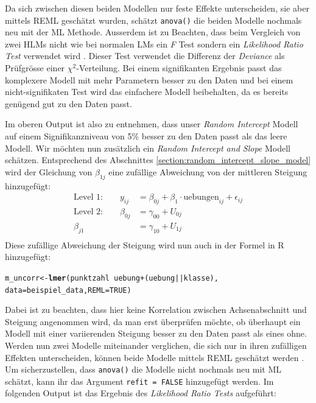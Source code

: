 \documentclass[12pt, a4paper]{article}\usepackage[]{graphicx}\usepackage[]{color}
\makeatletter
\newcommand{\hlnum}[1]{\textcolor[rgb]{0.686,0.059,0.569}{#1}}%
\newcommand{\hlopt}[1]{\textcolor[rgb]{0,0,0}{#1}}%
\newcommand{\hlstd}[1]{\textcolor[rgb]{0.345,0.345,0.345}{#1}}%
\newcommand{\hlkwb}[1]{\textcolor[rgb]{0.69,0.353,0.396}{#1}}%
\newcommand{\hlkwc}[1]{\textcolor[rgb]{0.333,0.667,0.333}{#1}}%
\newcommand{\hlkwd}[1]{\textcolor[rgb]{0.737,0.353,0.396}{\textbf{#1}}}%
\newenvironment{kframe}{%
 \def\at@end@of@kframe{}%
 \ifinner\ifhmode%
  \def\at@end@of@kframe{\end{minipage}}%
  \begin{minipage}{\columnwidth}%
 \fi\fi%
 \def\FrameCommand##1{\hskip\@totalleftmargin \hskip-\fboxsep
 \colorbox{shadecolor}{##1}\hskip-\fboxsep
     \hskip-\linewidth \hskip-\@totalleftmargin \hskip\columnwidth}%
 \MakeFramed {\advance\hsize-\width
   \@totalleftmargin\z@ \linewidth\hsize
   \@setminipage}}%
 {\par\unskip\endMakeFramed%
 \at@end@of@kframe}
\newenvironment{knitrout}{}{} %
\makeatother
\begin{document}
Da sich zwischen diesen beiden Modellen nur feste Effekte unterscheiden, sie aber mittels REML geschätzt wurden, schätzt \texttt{anova()} die beiden Modelle nochmals neu mit der ML Methode. Ausserdem ist zu Beachten, dass beim Vergleich von zwei HLMs nicht wie bei normalen LMs ein \textit{F} Test sondern ein \textit{Likelihood Ratio Test} verwendet wird \citep{PEUGH201085,SnijdersTomA.B2012Ma:a}. Dieser Test verwendet die Differenz der \textit{Deviance} als Prüfgrösse einer $\chi^2$-Verteilung. Bei einem signifikanten Ergebnis passt das komplexere Modell mit mehr Parametern besser zu den Daten und bei einem nicht-signifikaten Test wird das einfachere Modell beibehalten, da es bereits genügend gut zu den Daten passt.

Im oberen Output ist also zu entnehmen, dass unser \textit{Random Intercept} Modell auf einem Signifikanzniveau von 5\% besser zu den Daten passt als das leere Modell. Wir möchten nun zusätzlich ein \textit{Random Intercept and Slope} Modell schätzen. Entsprechend des Abschnittes \ref{section:random_intercept_slope_model} wird der Gleichung von $\beta_{1j}$ eine zufällige Abweichung von der mittleren Steigung hinzugefügt: 
\begin{equation} 
\begin{split}	
 \text{Level 1:}  \qquad y_{ij} & = \beta_{0j} + \beta_{1} \cdot \text{uebungen}_{ij} + \epsilon_{ij}\\
 \text{Level 2:} \qquad \beta_{0j} & = \gamma_{00} + U_{0j}\\
 \beta_{j1} & = \gamma_{10 }+ U_{1j}\\
\end{split}	
\end{equation} 
Diese zufällige Abweichung der Steigung wird nun auch in der Formel in R hinzugefügt:

\singlespacing
\begin{knitrout}
\color{fgcolor}\begin{kframe}
\begin{alltt}
\hlstd{m_uncorr} \hlkwb{<-} \hlkwd{lmer}\hlstd{(punktzahl} \hlopt{~} \hlstd{uebung} \hlopt{+} \hlstd{(uebung} \hlopt{||} \hlstd{klasse),}
        \hlkwc{data} \hlstd{= beispiel_data,} \hlkwc{REML} \hlstd{=} \hlnum{TRUE}\hlstd{)}
\end{alltt}
\end{kframe}
\end{knitrout}

Dabei ist zu beachten, dass hier keine Korrelation zwischen Achsenabschnitt und Steigung angenommen wird, da man erst überprüfen möchte, ob überhaupt ein Modell mit einer variierenden Steigung besser zu den Daten passt als eines ohne. Werden nun zwei Modelle miteinander verglichen, die sich nur in ihren zufälligen Effekten unterscheiden, können beide Modelle mittels REML geschätzt werden \citep{PEUGH201085}. Um sicherzustellen, dass \texttt{anova()} die Modelle nicht nochmals neu mit ML schätzt, kann ihr das Argument \texttt{refit = FALSE} hinzugefügt werden. Im folgenden Output ist das Ergebnis des \textit{Likelihood Ratio Tests} aufgeführt:
\end{document}
